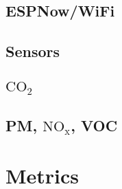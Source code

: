 \subsection{ESPNow/WiFi}

\subsection{Sensors}
\subsection{$\mathrm{CO_2}$}
\subsection{PM, $\mathrm{NO_x}$, VOC}

\section{Metrics}
